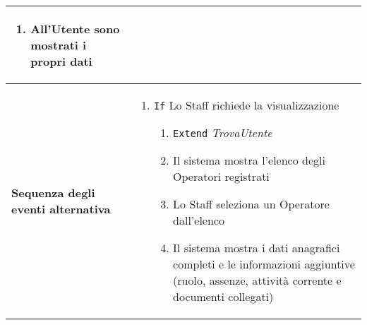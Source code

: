 \documentclass[a4paper]{report}
\begin{document}
\begin{table}[H]
\begin{tabular}{|p{3.9cm}|p{9.9cm}|}
\begin{enumerate}[leftmargin=14pt,label=\arabic*.,labelsep=0.5em,topsep=0pt,partopsep=0pt,parsep=0pt,itemsep=0pt]
    \item All’Utente sono mostrati i propri dati
    \end{enumerate} \\ \hline
\textbf{Sequenza degli eventi alternativa} & \begin{enumerate}[leftmargin=14pt,label=\arabic*.,labelsep=0.5em,topsep=0pt,partopsep=0pt,parsep=0pt,itemsep=0pt] 
    \item \texttt{If} Lo Staff richiede la visualizzazione
    \begin{enumerate}[label=\arabic{enumi}.\arabic*.,leftmargin=22pt,labelsep=0.5em,topsep=0pt,partopsep=0pt,parsep=0pt,itemsep=0pt]
        \item \texttt{Extend} \textit{TrovaUtente} 
        \item Il sistema mostra l’elenco degli Operatori registrati
        \item Lo Staff seleziona un Operatore dall’elenco
        \item Il sistema mostra i dati anagrafici completi e le informazioni aggiuntive (ruolo, assenze, attività corrente e documenti collegati)
    \end{enumerate}
\end{enumerate}\\ \hline
\end{tabular}
\end{table}
\end{document}
